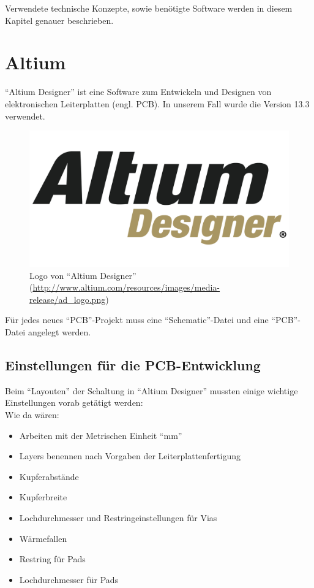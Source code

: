 Verwendete technische Konzepte, sowie benötigte Software werden in diesem Kapitel genauer beschrieben.

\section{Altium}\label{sec:3.1}
\enquote{Altium Designer} ist eine Software zum Entwickeln und Designen von elektronischen Leiterplatten (engl. PCB). In unserem Fall wurde die Version 13.3 verwendet. 
\begin{figure} [H]
	\centering
	\includegraphics[width=1\textwidth]{img/ad_logo.png}
	\caption{Logo von \enquote{Altium Designer} (\url{http://www.altium.com/resources/images/media-release/ad_logo.png})}
	\label{fig:3.1.1}
\end{figure}

Für jedes neues \enquote{PCB}-Projekt muss eine \enquote{Schematic}-Datei und eine \enquote{PCB}-Datei angelegt werden.



\subsection{Einstellungen für die PCB-Entwicklung}
Beim \enquote{Layouten} der Schaltung in \enquote{Altium Designer} mussten einige wichtige Einstellungen vorab getätigt werden:\\
Wie da wären:
\begin{itemize}
	\item Arbeiten mit der Metrischen Einheit \enquote{mm}
	\item Layers benennen nach Vorgaben der Leiterplattenfertigung
	\item Kupferabstände
	\item Kupferbreite
	\item Lochdurchmesser und Restringeinstellungen für Vias
	\item Wärmefallen
	\item Restring für Pads
	\item Lochdurchmesser für Pads
\end{itemize}

